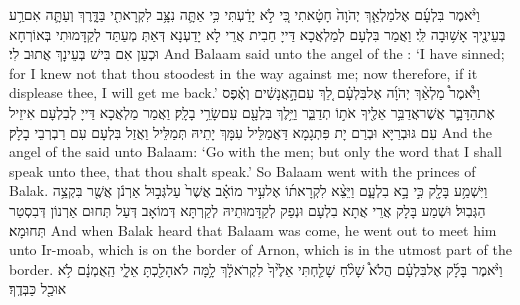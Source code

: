 {וַיֹּ֨אמֶר בִּלְעָ֜ם אֶל\maqqaf מַלְאַ֤ךְ יְהֹוָה֙ חָטָ֔אתִי כִּ֚י לֹ֣א יָדַ֔עְתִּי כִּ֥י אַתָּ֛ה נִצָּ֥ב לִקְרָאתִ֖י בַּדָּ֑רֶךְ וְעַתָּ֛ה אִם\maqqaf רַ֥ע בְּעֵינֶ֖יךָ אָשׁ֥וּבָה לִּֽי׃}
{וַאֲמַר בִּלְעָם לְמַלְאֲכָא דַּייָ חַבִית אֲרֵי לָא יָדַעְנָא דְּאַתְּ מְעַתַּד לְקַדָּמוּתִי בְּאוֹרְחָא וּכְעַן אִם בִּישׁ בְּעֵינָךְ אֲתוּב לִי׃}
{And Balaam said unto the angel of the \lord: ‘I have sinned; for I knew not that thou stoodest in the way against me; now therefore, if it displease thee, I will get me back.’}{}
{וַיֹּ֩אמֶר֩ מַלְאַ֨ךְ יְהֹוָ֜ה אֶל\maqqaf בִּלְעָ֗ם לֵ֚ךְ עִם\maqqaf הָ֣אֲנָשִׁ֔ים וְאֶ֗פֶס אֶת\maqqaf הַדָּבָ֛ר אֲשֶׁר\maqqaf אֲדַבֵּ֥ר אֵלֶ֖יךָ אֹת֣וֹ תְדַבֵּ֑ר וַיֵּ֥לֶךְ בִּלְעָ֖ם עִם\maqqaf שָׂרֵ֥י בָלָֽק׃}
{וַאֲמַר מַלְאֲכָא דַּייָ לְבִלְעָם אִיזֵיל עִם גּוּבְרַיָּא וּבְרַם יָת פִּתְגָמָא דַּאֲמַלֵּיל עִמָּךְ יָתֵיהּ תְּמַלֵּיל וַאֲזַל בִּלְעָם עִם רַבְרְבֵי בָלָק׃}
{And the angel of the \lord\space said unto Balaam: ‘Go with the men; but only the word that I shall speak unto thee, that thou shalt speak.’ So Balaam went with the princes of Balak.}{}
{וַיִּשְׁמַ֥ע בָּלָ֖ק כִּ֣י בָ֣א בִלְעָ֑ם וַיֵּצֵ֨א לִקְרָאת֜וֹ אֶל\maqqaf עִ֣יר מוֹאָ֗ב אֲשֶׁר֙ עַל\maqqaf גְּב֣וּל אַרְנֹ֔ן אֲשֶׁ֖ר בִּקְצֵ֥ה הַגְּבֽוּל׃}
{וּשְׁמַע בָּלָק אֲרֵי אֲתָא בִלְעָם וּנְפַק לְקַדָּמוּתֵיהּ לְקַרְתָּא דְּמוֹאָב דְּעַל תְּחוּם אַרְנוֹן דְּבִסְטַר תְּחוּמָא׃}
{And when Balak heard that Balaam was come, he went out to meet him unto Ir-moab, which is on the border of Arnon, which is in the utmost part of the border.}{}
{וַיֹּ֨אמֶר בָּלָ֜ק אֶל\maqqaf בִּלְעָ֗ם הֲלֹא֩ שָׁלֹ֨חַ שָׁלַ֤חְתִּי אֵלֶ֙יךָ֙ לִקְרֹא\maqqaf לָ֔ךְ לָ֥מָּה לֹא\maqqaf הָלַ֖כְתָּ אֵלָ֑י הַֽאֻמְנָ֔ם לֹ֥א אוּכַ֖ל כַּבְּדֶֽךָ׃}
